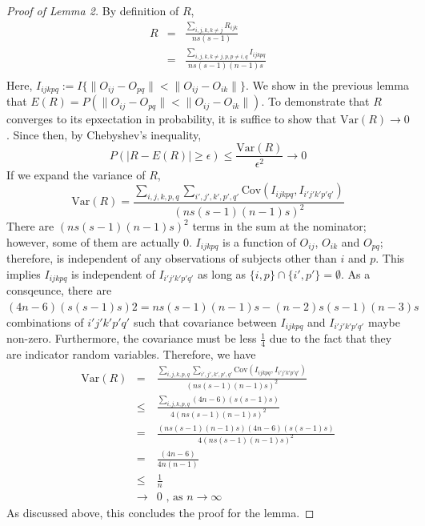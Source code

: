 \documentclass[11pt,journal,compsoc]{IEEEtran}
\begin{document}
\begin{proof}[Proof of Lemma 2]
By definition of $R$,
\begin{eqnarray*}  
R &=&\frac{\sum\limits_{i,j,k,k\neq j} R_{ijk}}{ns(s-1)}\\
&=& \frac{\sum\limits_{i,j,k,k \neq j,p,p\neq i,q} I_{ijkpq}}{ns(s-1)(n-1)s}\\
\end{eqnarray*}
Here, $I_{ijkpq}:=I\{\|O_{ij}-O_{pq}\| < \|O_{ij}-O_{ik}\| \}$. We show in the previous lemma that $E(R)=P(\|O_{ij}-O_{pq}\| < \|O_{ij}-O_{ik}\|)$. To demonstrate that $R$ converges to its epxectation in probability, it is suffice to show that $\text{Var}(R) \rightarrow 0$. Since then, by Chebyshev's inequality,
\[P(|R-E(R)| \geq \epsilon) \leq \frac{\text{Var}(R)}{\epsilon^2} \rightarrow 0\]
If we expand the variance of $R$, 
\[\text{Var}(R)= \frac{\sum\limits_{i,j,k,p,q} \sum\limits_{i',j',k',p',q'} \text{Cov}(I_{ijkpq},I_{i'j'k'p'q'})}{(ns(s-1)(n-1)s)^2} \]
There are $(ns(s-1)(n-1)s)^2$ terms in the sum at the nominator; however, some of them are actually 0. $I_{ijkpq}$ is a function of $O_{ij}$, $O_{ik}$ and $O_{pq}$; therefore, is independent of any observations of subjects other than $i$ and $p$. This implies $I_{ijkpq}$ is independent of $I_{i'j'k'p'q'}$ as long as $\{i,p\} \cap \{i',p'\} = \emptyset$. As a consqeunce, there are $(4n-6)(s(s-1)s)2=ns(s-1)(n-1)s-(n-2)s(s-1)(n-3)s$ combinations of $i'j'k'p'q'$ such that covariance between $I_{ijkpq}$ and $I_{i'j'k'p'q'}$ maybe non-zero. Furthermore, the covariance must be less $\frac{1}{4}$ due to the fact that they are indicator random variables. Therefore, we have 
\begin{eqnarray*} 
\text{Var}(R)&=& \frac{\sum\limits_{i,j,k,p,q} \sum\limits_{i',j',k',p',q'} \text{Cov}(I_{ijkpq},I_{i'j'k'p'q'})}{(ns(s-1)(n-1)s)^2} \\
&\leq& \frac{\sum\limits_{i,j,k,p,q}  (4n-6)(s(s-1)s)}{4(ns(s-1)(n-1)s)^2} \\
&=& \frac{ (ns(s-1)(n-1)s)(4n-6)(s(s-1)s)}{4(ns(s-1)(n-1)s)^2} \\
&=& \frac{(4n-6)}{4n(n-1)} \\
&\leq& \frac{1}{n}  \\
&\rightarrow& 0 \text{ , as $n\rightarrow \infty$} 
\end{eqnarray*}
As discussed above, this concludes the proof for the lemma.
\end{proof}
\end{document}
